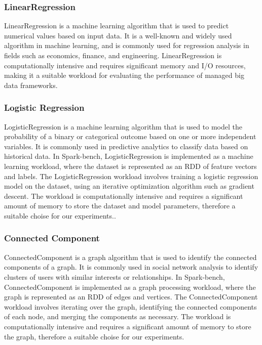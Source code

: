 \subsubsection{LinearRegression}
LinearRegression is a machine learning algorithm that is used to
predict numerical values based on input data. It is a well-known and
widely used algorithm in machine learning, and is commonly used for
regression analysis in fields such as economics, finance, and
engineering. LinearRegression is computationally intensive and
requires significant memory and I/O resources, making it a suitable
workload for evaluating the performance of managed big data frameworks.

\subsubsection{Logistic Regression}
LogisticRegression is a machine learning algorithm that is used to
model the probability of a binary or categorical outcome based on one
or more independent variables. It is commonly used in predictive
analytics to classify data based on historical data. In Spark-bench,
LogisticRegression is implemented as a machine learning workload,
where the dataset is represented as an RDD of feature vectors and
labels. The LogisticRegression workload involves training a logistic
regression model on the dataset, using an iterative optimization
algorithm such as gradient descent. The workload is computationally
intensive and requires a significant amount of memory to store the
dataset and model parameters, therefore a suitable choise for our experiments..

\subsubsection{Connected Component}
ConnectedComponent is a graph algorithm that is used to identify the
connected components of a graph. It is commonly used in social network
analysis to identify clusters of users with similar interests or
relationships. In Spark-bench, ConnectedComponent is implemented as a
graph processing workload, where the graph is represented as an RDD of
edges and vertices. The ConnectedComponent workload involves iterating
over the graph, identifying the connected components of each node, and
merging the components as necessary. The workload is computationally
intensive and requires a significant amount of memory to store the
graph, therefore a suitable choise for our experiments.

